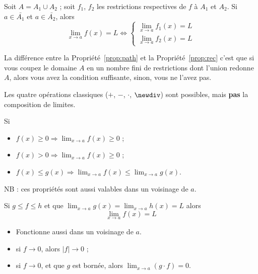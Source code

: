 \begin{myprop}
	\label{prop:rec}
	Soit $A = A_1 \cup A_2$ ; soit $f_1$, $f_2$ les restrictions respectives de $f$ à $A_1$ et $A_2$. Si $a \in \bar{A_1}$ et $a \in \bar{A_2}$, alors
	\[ \lim_{x \to a}f(x) = L \Leftrightarrow \left\{
	\begin{array}{l}
		\lim_{x \to a} f_1(x) = L \\
		\lim_{x \to a}f_2(x) = L
	\end{array} \right. \]
\end{myprop}

\begin{myrem}
	La différence entre la Propriété~\ref{prop:path} et la Propriété~\ref{prop:rec} c'est que
	si vous coupez le domaine $A$ en un nombre fini de restrictions dont l'union redonne $A$,
	alors vous avez la condition suffisante, sinon, vous ne l'avez pas.
\end{myrem}

\begin{myform}
	Les quatre opérations classiques ($+$, $-$, $\cdot$, $\newdiv$) sont possibles, mais \textbf{pas} la composition de limites.
\end{myform}

\begin{myprop}[Positivité] Si
	\begin{itemize}
		\item $f(x) \geq 0 \Rightarrow \lim_{x \to a} f(x) \geq 0$ ;
		\item $f(x) > 0 \Rightarrow \lim_{x \to a} f(x) \geq 0$ ;
		\item $f(x) \leq g(x) \Rightarrow \lim_{x \to a} f(x) \leq \lim_{x \to a} g(x)$.
	\end{itemize}
	NB : ces propriétés sont aussi valables dans un voisinage de $a$.
\end{myprop}

\begin{myprop}
	Si $g \leq f \leq h$ et que $\lim_{x \to a} g(x) = \lim_{x \to a} h(x) = L$ alors
	\[ \lim_{x \to a} f(x) = L \]
	\begin{itemize}
		\item Fonctionne aussi dans un voisinage de $a$.
	\end{itemize}
\end{myprop}

\begin{myform}\InsertTheoremBreak
	\begin{itemize}
		\item si $f \rightarrow 0$, alors $|f| \rightarrow 0$ ;
		\item si $f \to 0$, et que $g$ est bornée, alors $\lim_{x \to a} (g \cdot f) = 0$.
	\end{itemize}
\end{myform}

